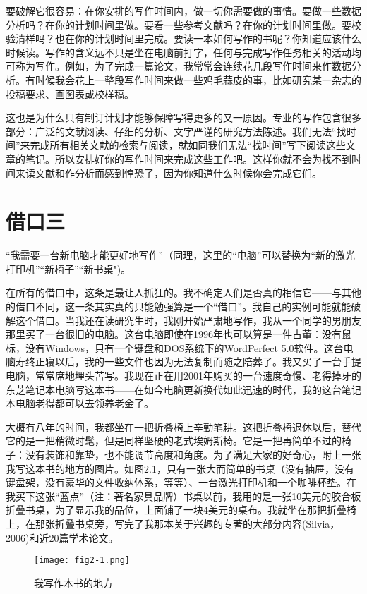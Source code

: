 要破解它很容易：在你安排的写作时间内，做一切你需要做的事情。要做一些数据分析吗？在你的计划时间里做。要看一些参考文献吗？在你的计划时间里做。要校验清样吗？也在你的计划时间里完成。要读一本如何写作的书呢？你知道应该什么时候读。写作的含义远不只是坐在电脑前打字，任何与完成写作任务相关的活动均可称为写作。例如，为了完成一篇论文，我常常会连续花几段写作时间来作数据分析。有时候我会花上一整段写作时间来做一些鸡毛蒜皮的事，比如研究某一杂志的投稿要求、画图表或校样稿。

这也是为什么只有制订计划才能够保障写得更多的又一原因。专业的写作包含很多部分：广泛的文献阅读、仔细的分析、文字严谨的研究方法陈述。我们无法“找时间”来完成所有相关文献的检索与阅读，就如同我们无法“找时间”写下阅读这些文章的笔记。所以安排好你的写作时间来完成这些工作吧。这样你就不会为找不到时间来读文献和作分析而感到惶恐了，因为你知道什么时候你会完成它们。


\section{借口三}
“我需要一台新电脑才能更好地写作”（同理，这里的“电脑”可以替换为“新的激光打印机”“新椅子”“新书桌")。

在所有的借口中，这条是最让人抓狂的。我不确定人们是否真的相信它——与其他的借口不同，这一条其实真的只能勉强算是一个“借口”。我自己的实例可能就能破解这个借口。当我还在读研究生时，我刚开始严肃地写作，我从一个同学的男朋友那里买了一台很旧的电脑。这台电脑即使在1996年也可以算是一件古董：没有鼠标，没有Windows，只有一个键盘和DOS系统下的WordPerfect 5.0软件。这台电脑寿终正寝以后，我的一些文件也因为无法复制而随之陪葬了。我又买了一台手提电脑，常常席地埋头苦写。我现在正在用2001年购买的一台速度奇慢、老得掉牙的东芝笔记本电脑写这本书——在如今电脑更新换代如此迅速的时代，我的这台笔记本电脑老得都可以去领养老金了。

大概有八年的时间，我都坐在一把折叠椅上辛勤笔耕。这把折叠椅退休以后，替代它的是一把稍微时髦，但是同样坚硬的老式埃姆斯椅。它是一把再简单不过的椅子：没有装饰和靠垫，也不能调节高度和角度。为了满足大家的好奇心，附上一张我写这本书的地方的图片。如图2.1，只有一张大而简单的书桌（没有抽屉，没有键盘架，没有豪华的文件收纳体系，等等）、一台激光打印机和一个咖啡杯垫。在我买下这张“蓝点”（注：著名家具品牌）书桌以前，我用的是一张10美元的胶合板折叠书桌，为了显示我的品位，上面铺了一块4美元的桌布。我就坐在那把折叠椅上，在那张折叠书桌旁，写完了我那本关于兴趣的专著的大部分内容(Silvia， 2006)和近20篇学术论文。

\begin{figure}[!htb]
\label{fig2-1}
\centering
\texttt{[image: fig2-1.png]}
\caption{我写作本书的地方}
\end{figure}



